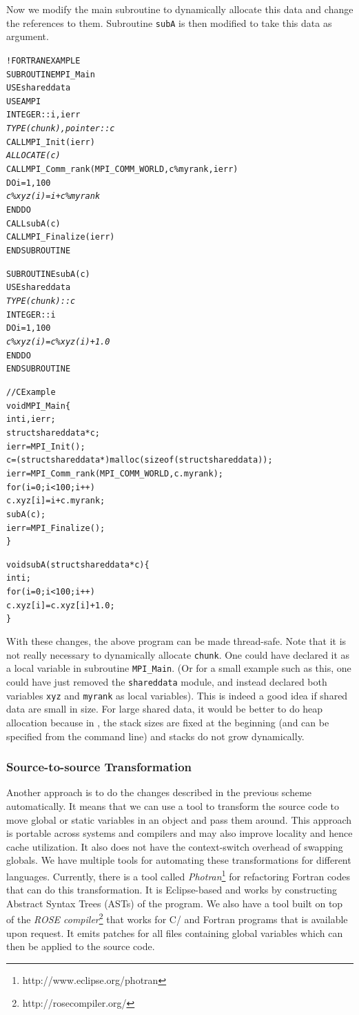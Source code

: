 \documentclass[10pt]{article}
\begin{document}
Now we modify the main subroutine to dynamically allocate this data and change the
references to them. Subroutine \texttt{subA} is then modified to take this data
as argument. 

\begin{alltt}
!FORTRAN EXAMPLE
SUBROUTINE MPI_Main
  USE shareddata
  USE AMPI
  INTEGER :: i, ierr
  \emph{TYPE(chunk), pointer :: c}
  CALL MPI_Init(ierr)
  \emph{ALLOCATE(c)}
  CALL MPI_Comm_rank(MPI_COMM_WORLD, c\%myrank, ierr)
  DO i = 1, 100
    \emph{c\%xyz(i) =  i + c\%myrank}
  END DO
  CALL subA(c)
  CALL MPI_Finalize(ierr)
END SUBROUTINE

SUBROUTINE subA(c)
  USE shareddata
  \emph{TYPE(chunk) :: c}
  INTEGER :: i
  DO i = 1, 100
    \emph{c\%xyz(i) = c\%xyz(i) + 1.0}
  END DO
END SUBROUTINE

//C Example
void MPI_Main\{
  int i,ierr;
  struct shareddata *c;
  ierr = MPI_Init();
  c = (struct shareddata*)malloc(sizeof(struct shareddata));
  ierr = MPI_Comm_rank(MPI_COMM_WORLD, c.myrank);
  for(i=0;i<100;i++)
    c.xyz[i] = i + c.myrank;
  subA(c);
  ierr = MPI_Finalize();
\}

void subA(struct shareddata *c)\{
  int i;
  for(i=0;i<100;i++)
    c.xyz[i] = c.xyz[i] + 1.0;
\}
\end{alltt}

With these changes, the above program can be made thread-safe. Note that it is
not really necessary to dynamically allocate \texttt{chunk}. One could have
declared it as a local variable in subroutine \texttt{MPI\_Main}.  (Or for a
small example such as this, one could have just removed the \texttt{shareddata}
module, and instead declared both variables \texttt{xyz} and \texttt{myrank} as
local variables). This is indeed a good idea if shared data are small in size.
For large shared data, it would be better to do heap allocation because in
\ampi{}, the stack sizes are fixed at the beginning (and can be specified from the
command line) and stacks do not grow dynamically.

\subsubsection{Source-to-source Transformation}
Another approach is to do the changes described in the previous 
scheme automatically. It means that we can use a tool to transform 
the source code to move global or static variables in an object and pass them around.
This approach is portable across systems and compilers and may also 
improve locality and hence cache utilization. It also does not have the 
context-switch overhead of swapping globals. We have multiple tools for automating 
these transformations for different languages. Currently, there is a tool 
called \emph{Photran}\footnote{http://www.eclipse.org/photran}
for refactoring Fortran codes that can do this transformation. It is Eclipse-based
and works by constructing Abstract Syntax Trees (ASTs) of the program. We
also have a tool built on top of the \emph{ROSE compiler}\footnote{http://rosecompiler.org/}
that works for C/\CC{} and Fortran programs that is available upon request. It emits
patches for all files containing global variables which can then be applied to the source code.
\end{document}
